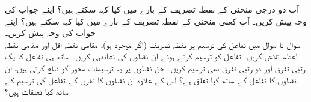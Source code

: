 \quad
آپ دو درجی منحنی  کے نقطہ تصریف کے بارے میں کیا کہہ سکتے ہیں؟ اپنے جواب کی وجہ پیش کریں۔
\quad
آپ کعبی منحنی  کے نقطہ تصریف کے بارے میں کیا کہہ سکتے ہیں؟ اپنے جواب کی وجہ پیش کریں۔
\\
سوال  تا سوال  میں تفاعل کی ترسیم پر نقطہ تصریف (اگر موجود ہو)، مقامی  نقطہ اقل اور مقامی نقطہ  اعظم  تلاش کریں۔ تفاعل کو ترسیم کرتے ہوئے ان نقطوں کی نشاندہی کریں۔ ساتھ ہی تفاعل کا یک رتبی تفرق اور دو رتبی تفرق بھی ترسیم کریں۔ جن نقطوں پر  یہ ترسیمات محور    کو قطع کرتی ہیں، ان  نقطوں کا تفاعل کے ساتھ کیا تعلق ہے؟ اس کے علاوہ  ان نقطوں کا تفرق کے تفاعل کی ترسیم کے ساتھ کیا تعلقات ہیں؟ 

